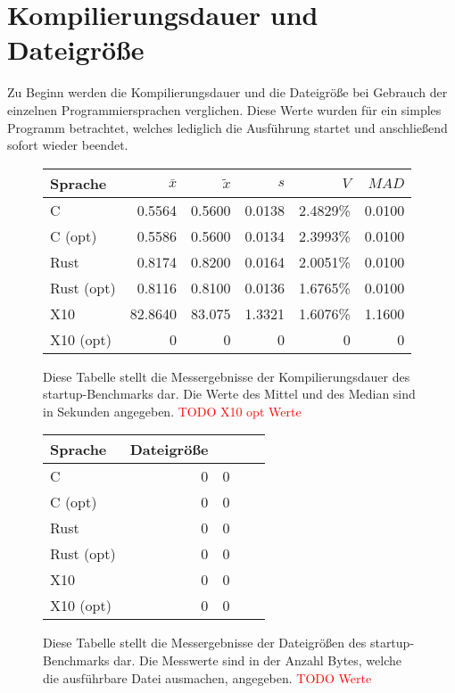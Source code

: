 \section{Kompilierungsdauer und Dateigröße}\label{sec:compile_time_filesize}

Zu Beginn werden die Kompilierungsdauer und die Dateigröße bei Gebrauch der einzelnen Programmiersprachen
verglichen. Diese Werte wurden für ein simples Programm betrachtet, welches lediglich die Ausführung startet und
anschließend sofort wieder beendet.

\begin{figure}[hb]
	\begin{center}
		\begin{tabular}{lrrrrr}
			\toprule
			Sprache    & $\bar{x}$ & $\tilde{x}$ & $s$ & $V$ & $MAD$ \\
			\midrule
			C          &  0.5564 & 0.5600 & 0.0138 & 2.4829\% & 0.0100 \\
			C (opt)    &  0.5586 & 0.5600 & 0.0134 & 2.3993\% & 0.0100 \\
			Rust       &  0.8174 & 0.8200 & 0.0164 & 2.0051\% & 0.0100 \\
			Rust (opt) &  0.8116 & 0.8100 & 0.0136 & 1.6765\% & 0.0100 \\
			X10        & 82.8640 & 83.075 & 1.3321 & 1.6076\% & 1.1600 \\
			X10 (opt)  &  0      & 0      & 0      & 0      & 0        \\
			\bottomrule
		\end{tabular}
	\end{center}
	\caption{
		Diese Tabelle stellt die Messergebnisse der Kompilierungsdauer des startup-Benchmarks dar. Die Werte
		des Mittel und des Median sind in Sekunden angegeben.
		\textcolor{red}{TODO X10 opt Werte}
	}
	\label{fig:compile_table}
\end{figure}

\begin{figure}[hb]
	\begin{center}
		\begin{tabular}{lrrrr}
			\toprule
			Sprache & Dateigröße \\
			\midrule
			C          & 0 & 0 \\
			C (opt)    & 0 & 0 \\
			Rust       & 0 & 0 \\
			Rust (opt) & 0 & 0 \\
			X10        & 0 & 0 \\
			X10 (opt)  & 0 & 0 \\
			\bottomrule
		\end{tabular}
	\end{center}
	\caption{
		Diese Tabelle stellt die Messergebnisse der Dateigrößen des startup-Benchmarks dar. Die Messwerte sind in
		der Anzahl Bytes, welche die ausführbare Datei ausmachen, angegeben.
		\textcolor{red}{TODO Werte}
	}
	\label{fig:filesize_table}
\end{figure}

